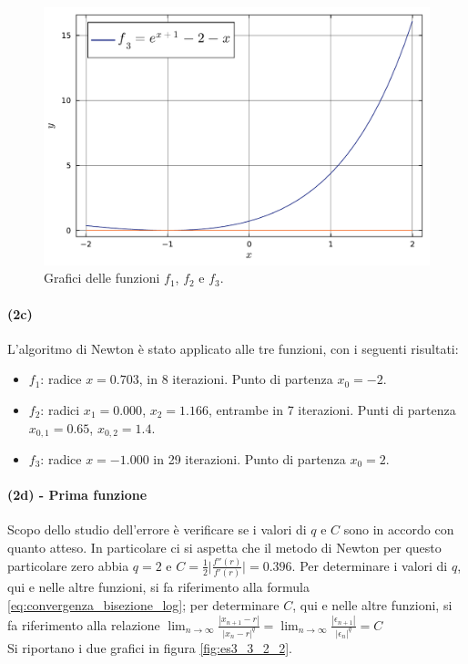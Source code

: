 \documentclass[letterpaper, 12pt]{article}
\numberwithin{equation}{section}    %
\begin{document}
\begin{figure}[!ht]
\begin{minipage}[b]{0.31\textwidth}
        \caption*{}
    \end{minipage}
    \hspace{0.2cm}
    \begin{minipage}[b]{0.31\textwidth}
        \includegraphics[width=\textwidth]{3323.pdf}
        \caption*{}
    \end{minipage}
    \caption{Grafici delle funzioni $f_1$, $f_2$ e $f_3$.}
    \label{fig:es3_3_2_1}
\end{figure}

\paragraph{(2c)}L'algoritmo di Newton è stato applicato alle tre funzioni, con i seguenti risultati:
\begin{itemize}
    \item $f_1$: radice $x = 0.703$, in 8 iterazioni. Punto di partenza $x_0 = -2$.
    \item $f_2$: radici $x_1 = 0.000$, $x_2 = 1.166$, entrambe in 7 iterazioni. Punti di partenza $x_{0,1} = 0.65$, $x_{0,2} = 1.4$.
    \item $f_3$: radice $x = -1.000$ in 29 iterazioni. Punto di partenza $x_0 = 2$.
\end{itemize}

\paragraph{(2d) - Prima funzione}
Scopo dello studio dell'errore è verificare se i valori di $q$ e $C$ sono in accordo con quanto atteso.
In particolare ci si aspetta che il metodo di Newton per questo particolare zero abbia $q = 2$ e 
$C = {\frac{1}{2}}\bigg|{\frac{f''(r)}{f'(r)}}\bigg| = 0.396$. Per determinare i valori di $q$, qui e nelle altre 
funzioni,
si fa riferimento alla formula \ref{eq:convergenza_bisezione_log}; per determinare $C$, qui e nelle altre funzioni,
si fa riferimento alla relazione 
$\lim_{n\to\infty} {\frac{|x_{n+1}-r|}{|x_n-r|^q}}= \lim_{n\to\infty} {\frac{|\epsilon_{n+1}|}{|\epsilon_n|^q}}=C$ \\
Si riportano i due grafici in figura \ref{fig:es3_3_2_2}.
\end{document}
